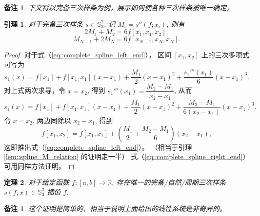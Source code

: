\documentclass[a4paper]{ctexart}
\newtheorem{theorem}{定理}
\newtheorem{remark}{备注}
\newtheorem*{remark*}{备注}
\newtheorem{lemma}[theorem]{引理}
\numberwithin{theorem}{section}
\numberwithin{equation}{section}
\numberwithin{figure}{section}
\numberwithin{remark}{section}
\begin{document}
\begin{remark}
下文将以完备三次样条为例，展示如何使各种三次样条被唯一确定。
\end{remark}

\begin{lemma}
    \label{lem::complete_spline_end_eqs}
对于完备三次样条 $s\in \mathbb{S}_3^{2}$, 记 $M_i=s''(f;x_i)$, 则有
\begin{equation}
    \label{eq::complete_spline_left_end}
2M_1+M_2=6 f[x_1,x_1,x_2],
\end{equation}
\begin{equation}
    \label{eq::complete_spline_right_end}
M_{N-1}+2M_N=6 f[x_{N-1},x_N,x_N].
\end{equation}
\end{lemma}

\begin{proof}
对于式（\ref{eq::complete_spline_left_end}），
区间 $[x_1,x_2]$ 上的三次多项式可写为
\begin{equation*}
s_1(x)
=f[x_1]
+f[x_1,x_1](x-x_1)
+\frac{M_1}{2}(x-x_1)^2
+\frac{s_1'''(x_1)}{6}(x-x_1)^3.
\end{equation*}
对上式两次求导，令 $x=x_2$, 得到 $s_1'''(x_1)=\dfrac{M_2-M_1}{x_2-x_1}$, 从而
\begin{equation}
    \label{eq::s1_poly_refined}
s_1(x)
=f[x_1]
+f[x_1,x_1](x-x_1)
+\frac{M_1}{2}(x-x_1)^2
+\frac{M_2-M_1}{6(x_2-x_1)}(x-x_1)^3.
\end{equation}
令 $x=x_2$, 两边同除以 $x_2-x_1$, 得到
\begin{equation*}
f[x_1,x_2]
=f[x_1,x_1]
+\left(\frac{M_1}{2}
+\frac{M_2-M_1}{6}\right)(x_2-x_1),
\end{equation*}
这即推出式（\ref{eq::complete_spline_left_end}）。
（相当于引理 \ref{lem::spline_M_relation} 的证明走一半）
式（\ref{eq::complete_spline_right_end}）可用同样方法证明。
\end{proof}

\begin{theorem}
    \label{thm::exist_unique_cubic_splines}
对于给定函数 $f:[a,b]\to\mathbb{R}$, 
存在唯一的完备/自然/周期三次样条 $s(f;x)\in \mathbb{S}_3^{2}$ 插值 $f$.
\end{theorem}
\begin{remark*}
    这个证明是简单的，相当于说明上面给出的线性系统是非奇异的。
\end{remark*}
\end{document}
